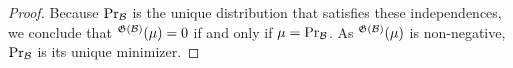 \documentclass{article}
\theoremstyle{plain}
\theoremstyle{definition}
\theoremstyle{remark}
\let\H\relax
\DeclareMathOperator{\H}{\mathrm{H}} %
\newcommand{\dg}[1]{\mathfrak{#1}}
\newcommand{\PDGof}[1]{\dg G(#1)}
\numberwithin{equation}{section}
\begin{document}
\begin{proof}
		Because $\Pr_{\cal B}$ is the unique distribution that satisfies these independences, we conclude that $\H^{\PDGof{\cal B}}(\mu) = 0$ if and only if $\mu = \Pr_{\cal B}$. 	
		As $\H^{\PDGof{\cal B}}(\mu)$ is non-negative, $\Pr_{\cal B}$ is its unique minimizer. 
		
		
	\end{proof}
\end{document}
